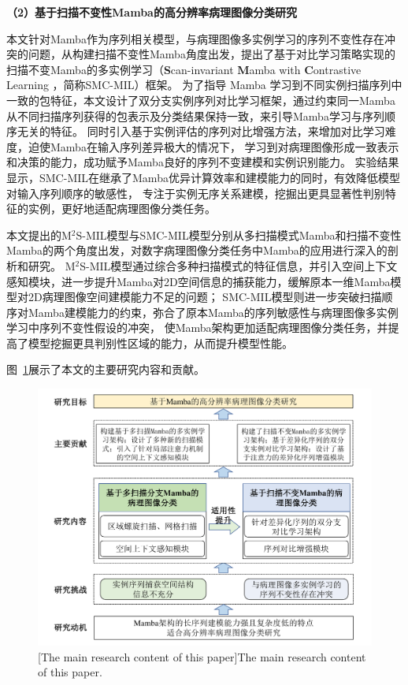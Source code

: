 \textbf{（2）基于扫描不变性Mamba的高分辨率病理图像分类研究}

本文针对Mamba作为序列相关模型，与病理图像多实例学习的序列不变性存在冲突的问题，从构建扫描不变性Mamba角度出发，提出了基于对比学习策略实现的扫描不变Mamba的多实例学习（\textbf{S}can-invariant \textbf{M}amba with \textbf{C}ontrastive Learning ，简称SMC-MIL）框架。
为了指导 Mamba 学习到不同实例扫描序列中一致的包特征，本文设计了双分支实例序列对比学习框架，通过约束同一Mamba从不同扫描序列获得的包表示及分类结果保持一致，来引导Mamba学习与序列顺序无关的特征。
同时引入基于实例评估的序列对比增强方法，来增加对比学习难度，迫使Mamba在输入序列差异极大的情况下，
学习到对病理图像形成一致表示和决策的能力，成功赋予Mamba良好的序列不变建模和实例识别能力。
实验结果显示，SMC-MIL在继承了Mamba优异计算效率和建模能力的同时，有效降低模型对输入序列顺序的敏感性，
专注于实例无序关系建模，挖掘出更具显著性判别特征的实例，更好地适配病理图像分类任务。

本文提出的M$^2$S-MIL模型与SMC-MIL模型分别从多扫描模式Mamba和扫描不变性Mamba的两个角度出发，对数字病理图像分类任务中Mamba的应用进行深入的剖析和研究。
M$^2$S-MIL模型通过综合多种扫描模式的特征信息，并引入空间上下文感知模块，进一步提升Mamba对2D空间信息的捕获能力，缓解原本一维Mamba模型对2D病理图像空间建模能力不足的问题；
SMC-MIL模型则进一步突破扫描顺序对Mamba建模能力的约束，弥合了原本Mamba的序列敏感性与病理图像多实例学习中序列不变性假设的冲突，
使Mamba架构更加适配病理图像分类任务，并提高了模型挖掘更具判别性区域的能力，从而提升模型性能。

图~\ref{figure1: 主要研究内容}展示了本文的主要研究内容和贡献。

\begin{figure}[h]
    \centering
    \includegraphics[width=1.0\columnwidth]{figures/研究内容.pdf}
    [The main research content of this paper]{The main research content of this paper.}
    \label{figure1: 主要研究内容}
\end{figure}

